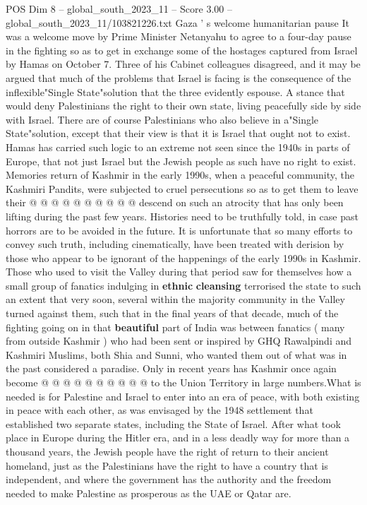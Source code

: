 \begin{textsample}{POS Dim 8 – global\_south\_2023\_11 – Score 3.00 – global\_south\_2023\_11/103821226.txt}  \label{ex:f8_pos_369}
Gaza ' s welcome humanitarian pause It was a welcome move by Prime Minister Netanyahu to agree to a four-day pause in the fighting so as to get in exchange some of the hostages captured from Israel by Hamas on October 7.
Three of his Cabinet colleagues disagreed, and it may be argued that much of the problems that Israel is facing is the consequence of the inflexible"Single State"solution that the three evidently espouse.
A stance that would deny Palestinians the right to their own state, living peacefully side by side with Israel.
There are of course Palestinians who also believe in a"Single State"solution, except that their view is that it is Israel that ought not to exist.
Hamas has carried such logic to an extreme not seen since the 1940s in parts of Europe, that not just Israel but the Jewish people as such have no right to exist.
Memories return of Kashmir in the early 1990s, when a peaceful community, the Kashmiri Pandits, were subjected to cruel persecutions so as to get them to leave their @ @ @ @ @ @ @ @ @ @ descend on such an atrocity that has only been lifting during the past few years.
Histories need to be truthfully told, in case past horrors are to be avoided in the future.
It is unfortunate that so many efforts to convey such truth, including cinematically, have been treated with derision by those who appear to be ignorant of the happenings of the early 1990s in Kashmir.
Those who used to visit the Valley during that period saw for themselves how a small group of fanatics indulging in \textbf{ethnic} \textbf{cleansing} terrorised the state to such an extent that very soon, several within the majority community in the Valley turned against them, such that in the final years of that decade, much of the fighting going on in that \textbf{beautiful} part of India was between fanatics ( many from outside Kashmir ) who had been sent or inspired by GHQ Rawalpindi and Kashmiri Muslims, both Shia and Sunni, who wanted them out of what was in the past considered a paradise.
Only in recent years has Kashmir once again become @ @ @ @ @ @ @ @ @ @ to the Union Territory in large numbers.What is needed is for Palestine and Israel to enter into an era of peace, with both existing in peace with each other, as was envisaged by the 1948 settlement that established two separate states, including the State of Israel.
After what took place in Europe during the Hitler era, and in a less deadly way for more than a thousand years, the Jewish people have the right of return to their ancient homeland, just as the Palestinians have the right to have a country that is independent, and where the government has the authority and the freedom needed to make Palestine as prosperous as the UAE or Qatar are.

\end{textsample}
